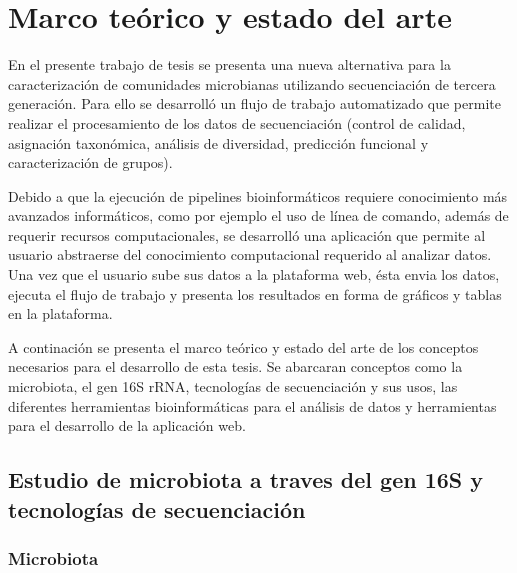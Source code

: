 \chapter{Marco teórico y estado del arte}

En el presente trabajo de tesis se presenta una nueva alternativa para la caracterización de comunidades microbianas utilizando secuenciación de tercera generación. Para ello se  desarrolló un flujo de trabajo automatizado que permite realizar el procesamiento de los datos de secuenciación (control de calidad, asignación taxonómica, análisis de diversidad, predicción funcional y caracterización de grupos). 

Debido a que la ejecución de pipelines bioinformáticos requiere conocimiento más avanzados informáticos, como por ejemplo el uso de línea de comando, además de requerir recursos computacionales, se desarrolló una aplicación que permite al usuario abstraerse del conocimiento computacional requerido al analizar datos. Una vez que el usuario sube sus datos a la plataforma web, ésta envia los datos, ejecuta el flujo de trabajo y presenta los resultados en forma de gráficos y tablas en la plataforma.


A continación se presenta el marco teórico y estado del arte de los conceptos necesarios para el desarrollo de esta tesis. %
Se abarcaran conceptos como la microbiota, el gen 16S rRNA, tecnologías de secuenciación y sus usos, las diferentes herramientas bioinformáticas para el análisis de datos y herramientas para el desarrollo de la aplicación web.
\section{Estudio de microbiota a traves del gen 16S y tecnologías de secuenciación}
\subsection{Microbiota}

